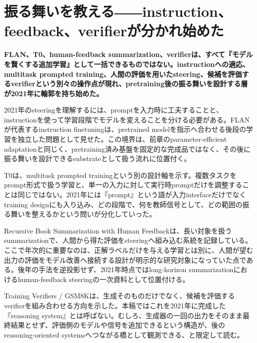 \section{振る舞いを教える――instruction、feedback、verifierが分かれ始めた}
\label{pkg:instruction-human-feedback}
\noindent\textbf{FLAN、T0、human-feedback summarization、verifierは、すべて『モデルを賢くする追加学習』として一括できるものではない。instructionへの適応、multitask prompted training、人間の評価を用いたsteering、候補を評価するverifierという別々の操作点が現れ、pretraining後の振る舞いを設計する層が2021年に輪郭を持ち始めた。}\autocite{src-34f845c1e710,src-6339600396eb,src-750bc3eeb1bc,src-7f768525daf5,src-8b2f7c40f4a4,src-90a37f62aeab}

2021年のsteeringを理解するには、promptを入力時に工夫することと、instructionを使って学習段階でモデルを変えることを分ける必要がある。FLANが代表するinstruction finetuningは、pretrained modelを指示へ合わせる後段の学習を独立した問題として見せた。この境界は、前章のparameter-efficient adaptationと同じく、pretraining済み基盤を固定的な完成品ではなく、その後に振る舞いを設計できるsubstrateとして扱う流れに位置付く。\autocite{src-8b2f7c40f4a4}


T0は、multitask prompted trainingという別の設計軸を示す。複数タスクをprompt形式で扱う学習と、単一の入力に対して実行時promptだけを調整することは同じではない。2021年には『prompt』という語が入力interfaceだけでなくtraining designにも入り込み、どの段階で、何を教師信号として、どの範囲の振る舞いを整えるかという問いが分化していった。\autocite{src-6339600396eb}


Recursive Book Summarization with Human Feedbackは、長い対象を扱うsummarizationで、人間から得た評価をsteeringへ組み込む系統を記録している。ここで年次的に重要なのは、正解ラベルだけを与える学習とは別に、人間が望む出力の評価をモデル改善へ接続する設計が明示的な研究対象になっていた点である。後年の手法を逆投影せず、2021年時点ではlong-horizon summarizationにおけるhuman-feedback steeringの一次資料として位置付ける。\autocite{src-7f768525daf5,src-90a37f62aeab}


Training Verifiers / GSM8Kは、生成そのものだけでなく、候補を評価するverifierを組み合わせる方向を示した。本稿ではこれを2021年に完成した『reasoning system』とは呼ばない。むしろ、生成器の一回の出力をそのまま最終結果とせず、評価側のモデルや信号を追加できるという構造が、後のreasoning-oriented systemsへつながる橋として観測できる、と限定して読む。\autocite{src-34f845c1e710,src-750bc3eeb1bc}


